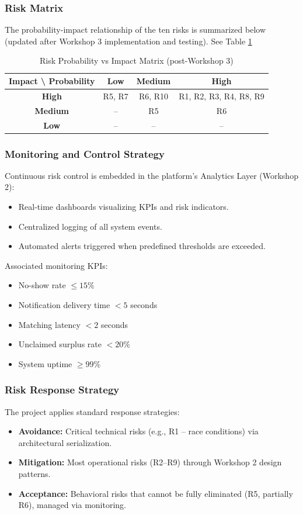 \documentclass[9pt,conference]{IEEEtran}
\begin{document}
\subsubsection{Risk Matrix}
The probability-impact relationship of the ten risks is summarized below (updated after Workshop 3 implementation and testing).
See Table \ref{risk}

\begin{table}[h]
\centering
\small
\caption{Risk Probability vs Impact Matrix (post-Workshop 3)}
\label{risk}
\begin{tabular}{c|c|c|c}
\toprule
\textbf{Impact \textbackslash{} Probability} & \textbf{Low} & \textbf{Medium} & \textbf{High} \\
\midrule
\textbf{High} & R5, R7 & R6, R10 & R1, R2, R3, R4, R8, R9 \\
\textbf{Medium} & -- & R5 & R6 \\
\textbf{Low} & -- & -- & -- \\
\bottomrule
\end{tabular}
\end{table}

\subsubsection{Monitoring and Control Strategy}
Continuous risk control is embedded in the platform’s Analytics Layer (Workshop 2):
\begin{itemize}
    \item Real-time dashboards visualizing KPIs and risk indicators.
    \item Centralized logging of all system events.
    \item Automated alerts triggered when predefined thresholds are exceeded.
\end{itemize}

Associated monitoring KPIs:
\begin{itemize}
    \item No-show rate $\leq 15\%$
    \item Notification delivery time $< 5$ seconds
    \item Matching latency $< 2$ seconds
    \item Unclaimed surplus rate $< 20\%$
    \item System uptime $\geq 99\%$
\end{itemize}

\subsubsection{Risk Response Strategy}
The project applies standard response strategies:
\begin{itemize}
    \item \textbf{Avoidance:} Critical technical risks (e.g., R1 – race conditions) via architectural serialization.
    \item \textbf{Mitigation:} Most operational risks (R2–R9) through Workshop 2 design patterns.
    \item \textbf{Acceptance:} Behavioral risks that cannot be fully eliminated (R5, partially R6), managed via monitoring.
\end{itemize}
\end{document}
